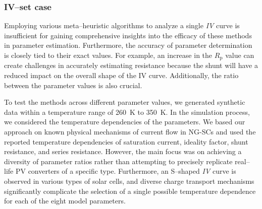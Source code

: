 \documentclass[a4paper,fleqn]{cas-sc}
\begin{document}
\subsubsection{IV--set case}\label{SetIV}

Employing various meta--heuristic algorithms to analyze a single \emph{IV} curve
is insufficient for gaining comprehensive insights into the efficacy of these methods in parameter estimation.
Furthermore, the accuracy of parameter determination is closely tied to their exact values.
For example, an increase in the $R_\mathrm{p}$ value can create challenges in accurately estimating resistance
because the shunt will have a reduced impact on the overall shape of the IV curve.
Additionally, the ratio between the parameter values is also crucial.

To test the methods across different parameter values, we generated synthetic data within a temperature range of 260~K to 350~K.
In the simulation process, we considered the temperature dependencies of the parameters.
We based our approach on known physical mechanisms of current flow in NG-SCs and
used the reported temperature dependencies of saturation current, ideality factor, shunt resistance, and series resistance.
However, the main focus was on achieving a diversity of parameter ratios rather
than attempting to precisely replicate real--life PV converters of a specific type.
Furthermore, an S--shaped \emph{IV} curve is observed in various types of solar cells,
and diverse charge transport mechanisms significantly complicate the selection of a single possible temperature dependence for each of the eight model parameters.
\end{document}

